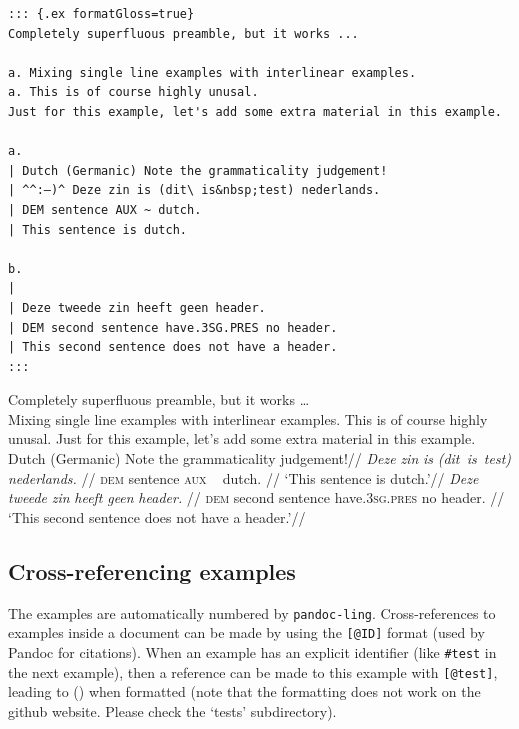 \documentclass[
]{article}
\begin{document}
\begin{verbatim}
::: {.ex formatGloss=true}
Completely superfluous preamble, but it works ...

a. Mixing single line examples with interlinear examples.
a. This is of course highly unusal.
Just for this example, let's add some extra material in this example.

a.
| Dutch (Germanic) Note the grammaticality judgement!
| ^^:–)^ Deze zin is (dit\ is&nbsp;test) nederlands.
| DEM sentence AUX ~ dutch.
| This sentence is dutch.

b.
|
| Deze tweede zin heeft geen header.
| DEM second sentence have.3SG.PRES no header.
| This second sentence does not have a header.
:::
\end{verbatim}

\begin{samepage}
 Completely superfluous preamble, but it works
\ldots{}\\
  \a Mixing single line examples with interlinear examples.
  \a This is of course highly unusal. Just for this example, let's add
some extra material in this example.
  \a 
  \begingl
  \glpreamble Dutch (Germanic) Note the grammaticality judgement!//
  \gla \ljudge{\textsuperscript{:--)}}\emph{Deze} \emph{zin} \emph{is}
\emph{(dit~is~test)} \emph{nederlands.} //
  \glb \textsc{dem} sentence \textsc{aux}  ~  dutch. //
  \glft `This sentence is dutch.'//
  \endgl
  \a 
  \begingl
  \gla \emph{Deze} \emph{tweede} \emph{zin} \emph{heeft} \emph{geen}
\emph{header.} //
  \glb \textsc{dem} second sentence have.\textsc{3sg}.\textsc{pres} no
header. //
  \glft `This second sentence does not have a header.'//
  \endgl
\xe
\end{samepage}

\hypertarget{cross-referencing-examples}{%
\subsection{Cross-referencing
examples}\label{cross-referencing-examples}}

The examples are automatically numbered by \texttt{pandoc-ling}.
Cross-references to examples inside a document can be made by using the
\texttt{{[}@ID{]}} format (used by Pandoc for citations). When an
example has an explicit identifier (like \texttt{\#test} in the next
example), then a reference can be made to this example with
\texttt{{[}@test{]}}, leading to () when formatted (note
that the formatting does not work on the github website. Please check
the `tests' subdirectory).
\end{document}
